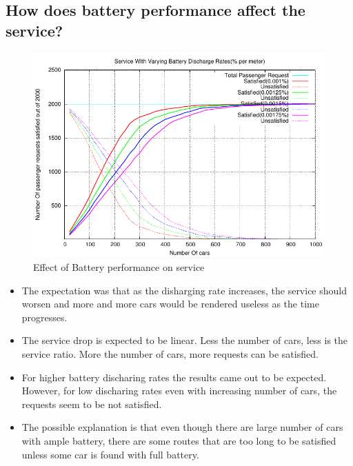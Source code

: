 \documentclass[11pt]{report}
\begin{document}
\begin{itemize}
\subsection{ How does battery performance affect the service?}

\begin{figure}[h!t]
\centering
\includegraphics[scale=0.9]{../plots/nCarVariation_old}
\caption{Effect of Battery performance on service}\label{fig:SVM}
\end{figure}

\begin{itemize}
\item The expectation was that as the disharging rate increases, the service should worsen and
	  more and more cars would be rendered useless as the time progresses.
\item The service drop is expected to be linear. Less the number of cars, less is the service ratio. More the number of cars, more requests can be satisfied.	  
\item For higher battery discharing rates the results came out to be expected. However, for low discharing rates even with increasing number of cars, the requests seem to be not satisfied. 
\item The possible explanation is that even though there are large number of cars with ample battery, there are some routes that are too long to be satisfied unless some car is found with full battery.
\end{itemize}
\newpage


\end{itemize}
\end{document}
